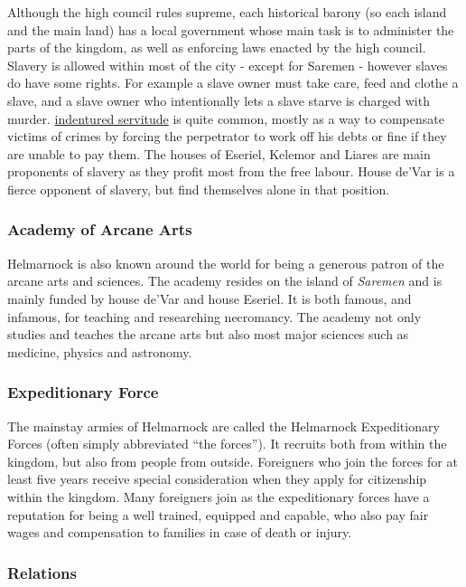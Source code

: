 Although the high council rules supreme, each historical barony (so each
island and the main land) has a local government whose main task is to
administer the parts of the kingdom, as well as enforcing laws enacted by the
high council. Slavery is allowed within most of the city - except for Saremen
- however slaves do have some rights. For example a slave owner must take
care, feed and clothe a slave, and a slave owner who intentionally lets a
slave starve is charged with murder. \hyperref[sec:Indentured
  Servitude]{indentured servitude} is quite common, mostly as a way to
compensate victims of crimes by forcing the perpetrator to work off his debts
or fine if they are unable to pay them. The houses of Eseriel, Kelemor and
Liares are main proponents of slavery as they profit most from the free
labour. House de'Var is a fierce opponent of slavery, but find themselves
alone in that position.

\subsubsection{Academy of Arcane Arts}
\label{sec:Academy of Arcane Arts}

Helmarnock is also known around the world for being a generous patron of the
arcane arts and sciences. The academy resides on the island of \emph{Saremen}
and is mainly funded by house de'Var and house Eseriel. It is both famous,
and infamous, for teaching and researching necromancy. The academy not only
studies and teaches the arcane arts but also most major sciences such as
medicine, physics and astronomy.

\subsubsection{Expeditionary Force}
\label{sec:Expeditionary Force}

The mainstay armies of Helmarnock are called the Helmarnock Expeditionary
Forces (often simply abbreviated ``the forces''). It recruits both from within
the kingdom, but also from people from outside. Foreigners who join the forces
for at least five years receive special consideration when they apply for
citizenship within the kingdom. Many foreigners join as the expeditionary
forces have a reputation for being a well trained, equipped and capable, who
also pay fair wages and compensation to families in case of death or injury.

\subsubsection{Relations}

